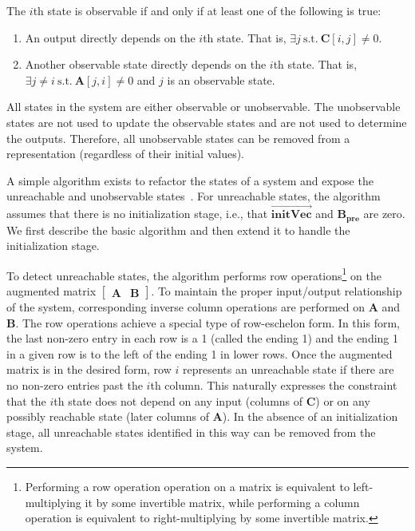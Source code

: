 The $i$th state is observable if and only if at least one of the
following is true:
\begin{enumerate}
\item An output directly depends on the $i$th state.  That is,
$\exists j~\mbox{s.t.}~\mathbf{C}[i,j] \ne 0$.

\item Another observable state directly depends on the $i$th state.
That is, $\exists j \ne i~\mbox{s.t.}~\mathbf{A}[j,i] \ne 0$ and $j$
is an observable state.
\end{enumerate}
All states in the system are either observable or unobservable.  The
unobservable states are not used to update the observable states and
are not used to determine the outputs.  Therefore, all unobservable
states can be removed from a representation (regardless of their
initial values).

A simple algorithm exists to refactor the states of a system and
expose the unreachable and unobservable states~\cite{Mayne}.  For
unreachable states, the algorithm assumes that there is no
initialization stage, i.e., that $\overrightarrow{\mathbf{initVec}}$
and $\mathbf{B_{pre}}$ are zero.  We first describe the basic
algorithm and then extend it to handle the initialization stage.

To detect unreachable states, the algorithm performs row
operations\footnote{\smaller Performing a row operation operation on a
matrix is equivalent to left-multiplying it by some invertible matrix,
while performing a column operation is equivalent to right-multiplying
by some invertible matrix.} on the augmented matrix $\left [
\begin{array} {cc} \mathbf{A} & \mathbf{B} \end{array} \right ]$.  To 
maintain the proper input/output relationship of the system,
corresponding inverse column operations are performed on $\mathbf{A}$
and $\mathbf{B}$.  The row operations achieve a special type of
row-eschelon form.  In this form, the last non-zero entry in each row
is a 1 (called the ending 1) and the ending 1 in a given row is to the
left of the ending 1 in lower rows.  Once the augmented matrix is in
the desired form, row $i$ represents an unreachable state if there are
no non-zero entries past the $i$th column.  This naturally expresses
the constraint that the $i$th state does not depend on any input
(columns of $\mathbf{C}$) or on any possibly reachable state (later
columns of $\mathbf{A}$).  In the absence of an initialization stage,
all unreachable states identified in this way can be removed from the
system.

